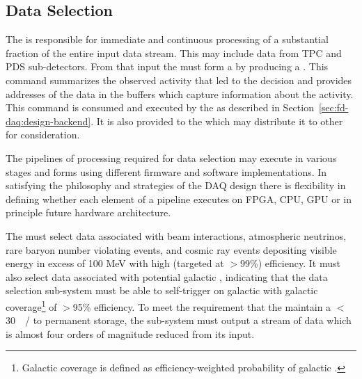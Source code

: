 



\subsection{Data Selection}
\label{sec:sp-daq:design-selection-algs}

The  is responsible for immediate and continuous processing of a substantial fraction of the entire input data stream. 
This may include data from TPC and PDS sub-detectors.
From that input the  must form a  by producing a .
This command summarizes the observed activity that led to the decision and provides addresses of the data in the  buffers which capture information about the activity.
This command is consumed and executed by the  as described in Section~\ref{sec:fd-daq:design-backend}. 
It is also provided to the  which may distribute it to other  for consideration.

The pipelines of processing required for data selection may execute in various stages and forms using different firmware and software implementations.
In satisfying the philosophy and strategies of the DAQ design there is flexibility in defining whether each element of a pipeline executes on FPGA, CPU, GPU or in principle future hardware architecture.

The  must select data associated with beam interactions, atmospheric neutrinos, rare baryon number violating events, and cosmic ray events depositing visible energy in excess of 100 MeV with high (targeted at $>$99\%) efficiency.
It must also select data associated with potential galactic , indicating that the data selection sub-system must be able to self-trigger on galactic  with galactic coverage\footnote{Galactic coverage is defined as efficiency-weighted probability of galactic .} of $>$95\% efficiency.
To meet the requirement that the   maintain a $<$\SI{30}{\peta\byte/\year} to permanent storage, the  sub-system must output a stream of data which is almost four orders of magnitude reduced from its input.



